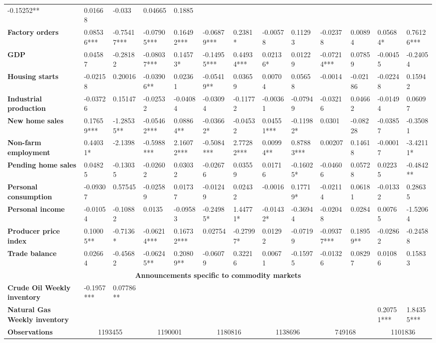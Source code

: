 \begin{sidewaystable}
{\begin{tabular}{@{}lllllllllllll@{}}
-0.15252** & 0.01668 & -0.033 & 0.04665 & 0.1885 \\ \textbf{Factory orders}& 0.08536***& -0.75417***& -0.07905*** & 0.16492*** & -0.06879*** & 0.2381* & -0.00578 & 0.11293 & -0.02378 & 0.00894 & 0.05684* & 0.76126*** \\ \textbf{GDP}& 0.04587 & -0.28182 & -0.08037*** & 0.14573* & -0.14955*** & 0.44934*** & 0.02136* & 0.01229 & -0.07214*** & 0.07859 & -0.00455 & -0.24054 \\ \textbf{Housing starts}& -0.02158 & 0.20016 & -0.03906** & 0.02361 & -0.05419** & 0.03659 & 0.00704 & 0.05658 & -0.0014 & -0.02186 & -0.02248 & 0.15942 \\ \textbf{Industrial production}& -0.03726 & 0.15147 & -0.02532 & -0.04084 & -0.03094 & -0.11772 & -0.00361 & -0.07949 & -0.03216 & 0.04662 & -0.01494 & 0.06097 \\ \textbf{New home sales}& 0.17659*** & -1.28535** & -0.05462*** & 0.08864** & -0.03662* & -0.04532 & 0.04551*** & -0.11982* & 0.0301 & -0.08228 & -0.03857 & -0.35081 \\ \textbf{Non-farm employment}& 0.44031* & -2.1398 & -0.5988*** & 2.16072*** & -0.5084*** & 2.77282*** & 0.00994** & 0.87883*** & 0.00207 & 0.14618 & -0.00017 & -3.42111* \\ \textbf{Pending home sales}& 0.04825 & -0.13035 & -0.02602 & 0.03032 & -0.02676 & 0.03559 & 0.01716 & -0.16025* & -0.04606 & 0.05728 & 0.02235 & -0.4842** \\ \textbf{Personal consumption}& -0.09307 & 0.57545 & -0.02589 & 0.01737 & -0.01249 & 0.02432 & -0.0016 & 0.17719* & -0.02114 & 0.06181 & -0.01332 & 0.28635 \\ \textbf{Personal income}& -0.01054 & -0.10882 & 0.0135 & -0.09583 & -0.24985* & 1.44771* & -0.01432* & -0.36944 & -0.02048 & 0.0284 & 0.00765 & -1.52064 \\ \textbf{Producer price index}& 0.10005** & -0.7136* & -0.06214*** & 0.16732*** & 0.02754 & -0.27997* & 0.01292 & -0.07199 & -0.09377*** & 0.18959** & -0.02862 & -0.24588 \\ \textbf{Trade balance}& 0.02664 & -0.45682 & -0.06245** & 0.20809** & -0.06079 & 0.32216 & 0.00671 & -0.15975 & -0.01326 & 0.08297 & 0.01086 & 0.15833 \\  \midrule \multicolumn{13}{c}{\textbf{Announcements specific to commodity markets}} \\ \midrule \textbf{Crude Oil Weekly inventory}& -0.1957*** & 0.07786** &  &  &  &  &  &  &  &  &  &  \\ \textbf{Natural Gas Weekly inventory}&  &  &  &  &  &  &  &  &  &  & 0.20751*** & 1.84355*** \\  \midrule \textbf{Observations}             &\multicolumn{2}{c}{ 1193455 }                                                 & \multicolumn{2}{c}{ 1190001 }                                                 & \multicolumn{2}{c}{ 1180816 }                                                 & \multicolumn{2}{c}{ 1138696 }                                                 & \multicolumn{2}{c}{ 749168 }                                                   & \multicolumn{2}{c}{ 1101836 }                                     
\end{tabular}}
\end{sidewaystable}
